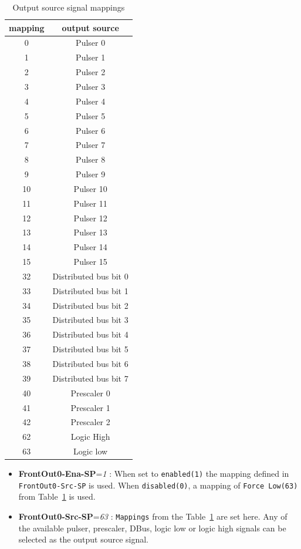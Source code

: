 \documentclass[12pt,a4paper]{article}
\begin{document}
\begin{table}[!hbt]
\caption{Output source signal mappings}
\label{tab:mappings}
\centering
	\begin{tabular}{|c|c|}
		\hline \textbf{mapping} & \textbf{output source} \\ \hline 
		\hline 0 & Pulser 0 \\ 
		\hline 1 & Pulser 1 \\ 
		\hline 2 & Pulser 2 \\ 
		\hline 3 & Pulser 3 \\ 
		\hline 4 & Pulser 4 \\ 
		\hline 5 & Pulser 5 \\ 
		\hline 6 & Pulser 6 \\ 
		\hline 7 & Pulser 7 \\ 
		\hline 8 & Pulser 8 \\ 
		\hline 9 & Pulser 9 \\ 
		\hline 10 & Pulser 10 \\ 
		\hline 11 & Pulser 11 \\ 
		\hline 12 & Pulser 12 \\ 
		\hline 13 & Pulser 13 \\ 
		\hline 14 & Pulser 14 \\ 
		\hline 15 & Pulser 15 \\ 
		\hline 32 & Distributed bus bit 0 \\ 
		\hline 33 & Distributed bus bit 1 \\ 
		\hline 34 & Distributed bus bit 2 \\ 
		\hline 35 & Distributed bus bit 3 \\ 
		\hline 36 & Distributed bus bit 4 \\ 
		\hline 37 & Distributed bus bit 5 \\ 
		\hline 38 & Distributed bus bit 6 \\ 
		\hline 39 & Distributed bus bit 7 \\ 
		\hline 40 & Prescaler 0 \\ 
		\hline 41 & Prescaler 1 \\ 
		\hline 42 & Prescaler 2 \\ 
		\hline 62 & Logic High \\ 
		\hline 63 & Logic low \\ 
		\hline 
	\end{tabular} 
\end{table}

  \begin{itemize}
  \item
   \textbf{FrontOut0-Ena-SP}=\emph{1} : When set to \texttt{enabled(1)} the mapping
    defined in \newline \texttt{FrontOut0-Src-SP} is used. When \texttt{disabled(0)}, a
    mapping of \texttt{Force Low(63)} from Table~\ref{tab:mappings} is used.
  \item
    \textbf{FrontOut0-Src-SP}=\emph{63} : \texttt{Mappings} from the Table~\ref{tab:mappings} are
    set here. Any of the available pulser, prescaler, DBus, logic low or
    logic high signals can be selected as the output source signal.
  \end{itemize}
\end{document}
